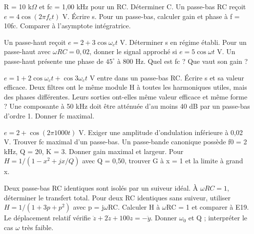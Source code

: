 R = 10 k$\Omega$ et fc = 1,00 kHz pour un RC. Déterminer C.
Un passe-bas RC reçoit $e=4\cos(2\pi f_ct)$ V. Écrire s.
Pour un passe-bas, calculer gain et phase à f = 10fc. Comparer à l’asymptote intégratrice.


Un passe-haut reçoit $e=2+3\cos\omega_ct$ V. Déterminer s en régime établi.
Pour un passe-haut avec $\omega RC=0{,}02$, donner le signal approché si $e=5\cos\omega t$ V.
Un passe-haut présente une phase de $45^\circ$ à 800 Hz. Quel est fc ? Que vaut son gain ?


$e=1+2\cos\omega_ct+\cos3\omega_ct$ V entre dans un passe-bas RC. Écrire s et sa valeur efficace.
Deux filtres ont le même module H à toutes les harmoniques utiles, mais des phases différentes. Leurs sorties ont-elles même valeur efficace et même forme ?
Une composante à 50 kHz doit être atténuée d’au moins 40 dB par un passe-bas d’ordre 1. Donner fc maximal.


$e=2+\cos(2\pi1000t)$ V. Exiger une amplitude d’ondulation inférieure à 0,02 V. Trouver fc maximal d’un passe-bas.
Un passe-bande canonique possède f0 = 2 kHz, Q = 20, K = 3. Donner gain maximal et largeur.
Pour $H=1/(1-x^2+jx/Q)$ avec Q = 0,50, trouver G à x = 1 et la limite à grand x.


Deux passe-bas RC identiques sont isolés par un suiveur idéal. À $\omega RC=1$, déterminer le transfert total.
Pour deux RC identiques sans suiveur, utiliser $H=1/(1+3p+p^2)$ avec p = j\ensuremath{\omega}RC. Calculer H à \ensuremath{\omega}RC = 1 et comparer à E19.
Le déplacement relatif vérifie $\ddot z+2\dot z+100z=-\ddot y$. Donner \ensuremath{\omega_0} et Q ; interpréter le cas \ensuremath{\omega} très faible.


